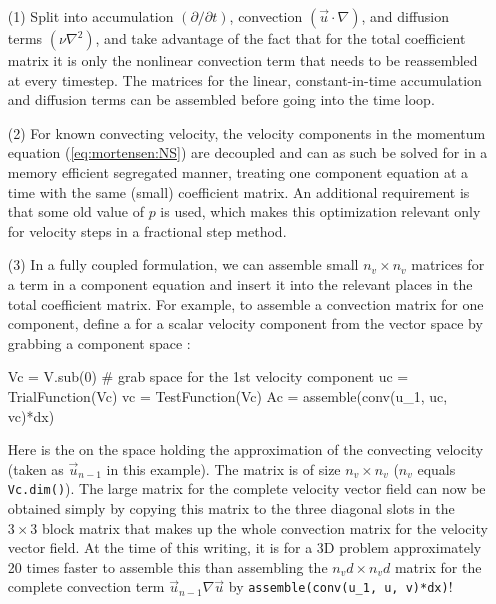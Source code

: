 \begin{itemize}
 \item[(1)] Split  into accumulation $(\partial /\partial t)$,
convection $(\vec{u}\cdot\nabla)$, and diffusion terms
$(\nu\nabla^2)$, and take advantage of the fact that for the total
coefficient matrix it is only the nonlinear convection term that needs
to be reassembled at every timestep. The matrices for the linear,
constant-in-time accumulation and diffusion terms can be assembled
before going into the time loop.

\item[(2)] For known convecting velocity, 
 the velocity components in the momentum equation (\eqref{eq:mortensen:NS})
 are decoupled and can as such be solved for in a
 memory efficient segregated manner, treating one component equation
 at a time with the same (small) coefficient matrix. An additional requirement is that some old value of $p$ is used,
 which makes this optimization relevant only for velocity steps in
 a fractional step method.

\item[(3)]
 In a fully coupled formulation,
 we can assemble small $n_v\times n_v$ matrices for a term in a
 component equation and insert it into the relevant places in
 the total coefficient matrix.
 For example, to assemble a convection matrix for one component, define
 a  for a scalar velocity component from the 
 vector space  by grabbing a component space :
\begin{python}
Vc = V.sub(0)  # grab space for the 1st velocity component
uc = TrialFunction(Vc)
vc = TestFunction(Vc)
Ac = assemble(conv(u_1, uc, vc)*dx)
\end{python}
Here  is the  on the space 
holding the approximation of the
convecting velocity (taken as $\vec{u}_{n-1}$ in this example). 
The matrix  is of size $n_v\times n_v$ ($n_v$ equals
{\fontsize{12pt}{12pt}\texttt{Vc.dim()}}).
The large matrix for the complete velocity vector field can now be
obtained simply by copying this  matrix to the three diagonal
slots in the $3\times 3$ block matrix that makes up the whole
convection matrix for the velocity vector field.  At the time of this
writing, it is for a 3D problem approximately 20 times faster to
assemble this  than assembling the $n_vd\times n_vd$ matrix
for the complete convection term $\vec{u}_{n-1}\nabla
\vec{u}$ by {\fontsize{12pt}{12pt}\verb!assemble(conv(u_1, u, v)*dx)!}!


\end{itemize}

